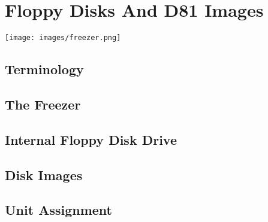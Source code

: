 \chapter{Floppy Disks And D81 Images}
\label{cha:freezer}


\texttt{[image: images/freezer.png]}

\section{Terminology}

\section{The Freezer}

\section{Internal Floppy Disk Drive}

\section{Disk Images}

\section{Unit Assignment}


